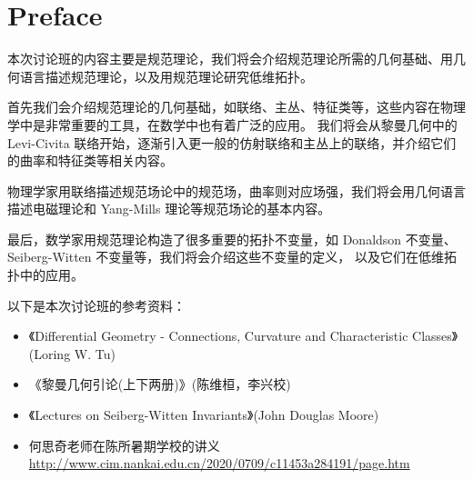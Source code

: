\section*{Preface}
{
    \setlength{\parskip}{2ex}
    本次讨论班的内容主要是规范理论，我们将会介绍规范理论所需的几何基础、用几何语言描述规范理论，以及用规范理论研究低维拓扑。

    首先我们会介绍规范理论的几何基础，如联络、主丛、特征类等，这些内容在物理学中是非常重要的工具，在数学中也有着广泛的应用。
    我们将会从黎曼几何中的 Levi-Civita 联络开始，逐渐引入更一般的仿射联络和主丛上的联络，并介绍它们的曲率和特征类等相关内容。

    物理学家用联络描述规范场论中的规范场，曲率则对应场强，我们将会用几何语言描述电磁理论和 Yang-Mills 理论等规范场论的基本内容。

    最后，数学家用规范理论构造了很多重要的拓扑不变量，如 Donaldson 不变量、Seiberg-Witten 不变量等，我们将会介绍这些不变量的定义，
    以及它们在低维拓扑中的应用。

    以下是本次讨论班的参考资料：
    \begin{itemize}
        \item 《Differential Geometry - Connections, Curvature and Characteristic Classes》(Loring W. Tu)
        \item 《黎曼几何引论(上下两册)》(陈维桓，李兴校)
        \item 《Lectures on Seiberg-Witten Invariants》(John Douglas Moore)
        \item 何思奇老师在陈所暑期学校的讲义 \url{http://www.cim.nankai.edu.cn/2020/0709/c11453a284191/page.htm}
    \end{itemize}
}
